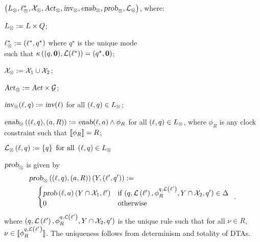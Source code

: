$\left({L}_\otimes, \ell^*_\otimes, \mathcal{X}_\otimes, \mbox{\sl Act}_\otimes, \mbox{\sl inv}_\otimes, \mbox{\sl enab}_\otimes,  \mbox{\sl prob}_\otimes, \mathcal{L}_\otimes\right)$, where:
\begin{compactitem}
\item $L_\otimes:=L\times Q$;
\item $\ell^*_\otimes:=(\ell^*, q^\star)$ where $q^\star$ is the unique mode\\
    such that $\kappa\left((q,\mathbf{0}), \mathcal{L}(\ell^*)\right)=(q^\star,\mathbf{0})$;
\item $\mathcal{X}_\otimes:=\mathcal{X}_1\cup\mathcal{X}_2$;
\item $\mbox{\sl Act}_\otimes:=\mbox{\sl Act}\times\mathcal{G}$; %
\item $\mbox{\sl inv}_\otimes(\ell,q):=\mbox{\sl inv}(\ell)$ for all $(\ell,q)\in L_\otimes$;
\item $\mbox{\sl enab}_\otimes\left((\ell,q), (a,R)\right):=\mbox{\sl enab}(\ell,a)\wedge \phi_R$ for all $(\ell,q)\in L_\otimes$, where $\phi_R$ is any clock constraint such that ${\llbracket}{\phi_R}{\rrbracket}=R$;
\item 
$
    \mathcal{L}_\otimes \left(
        \ell,q
    \right)
        := \left \{
            q
        \right \}
    \mbox{ for all } \left ( 
        \ell,q
    \right )
    \in L_\otimes
$
\item $\mbox{\sl prob}_\otimes$ is given by
\begin{align*}
&\prob_\otimes\left((\loc,\dtloc),(a,R)\right)(Y,(\loc',\dtloc')):=\\
&\quad\begin{cases}
\prob\left(\loc,a\right)(Y\cap \clocks_1,\loc') & \mbox{if } (\dtloc,\lbfunc\left(\loc'\right), \phi^{\dtloc,\lbfunc\left(\loc'\right)}_R, Y\cap \clocks_2, \dtloc')\in\rules\\%
0 & \mbox{otherwise}
\end{cases}\enskip.
\end{align*}
where $(q,\mathcal{L}\left(\ell'\right), \phi^{q,\mathcal{L}\left(\ell'\right)}_R, Y\cap \mathcal{X}_2, q')$ is the unique rule such that for all $\nu\in R$, $\nu\in{\llbracket}{\phi^{q,\mathcal{L}\left(\ell'\right)}_R}{\rrbracket}$.
The uniqueness follows from determinism and totality of DTAs.
\end{compactitem}


